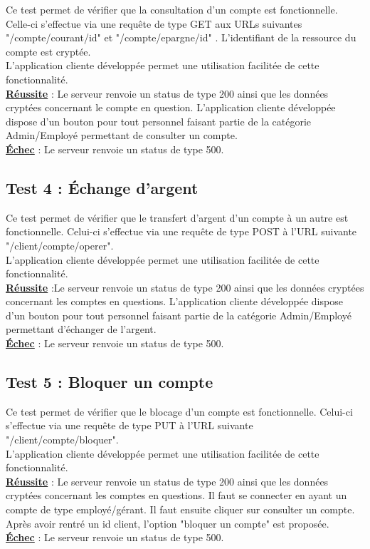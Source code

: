 Ce test permet de vérifier que la consultation d'un compte est fonctionnelle.
Celle-ci s'effectue via une requête de type GET aux URLs suivantes "/compte/courant/{id}" et "/compte/epargne/{id}" .
L'identifiant de la ressource du compte est cryptée.
\\
L'application cliente développée permet une utilisation facilitée de cette fonctionnalité. 
\\
\textbf{\underline{Réussite}} : Le serveur renvoie un status de type 200 ainsi que les données cryptées concernant le compte en question.
L'application cliente développée dispose d'un bouton pour tout personnel faisant partie de la catégorie Admin/Employé permettant de consulter un compte.
\\
\textbf{\underline{Échec}} : Le serveur renvoie un status de type 500.

\subsection{Test 4 : Échange d'argent}

Ce test permet de vérifier que le transfert d'argent d'un compte à un autre est fonctionnelle.
Celui-ci s'effectue via une requête de type POST à l’URL suivante "/client/compte/operer".
\\
L'application cliente développée permet une utilisation facilitée de cette fonctionnalité. 
\\
\textbf{\underline{Réussite}} :Le serveur renvoie un status de type 200 ainsi que les données cryptées concernant les comptes en questions.
L'application cliente développée dispose d'un bouton pour tout personnel faisant partie de la catégorie Admin/Employé permettant d'échanger de l'argent.
\\
\textbf{\underline{Échec}} : Le serveur renvoie un status de type 500.

\subsection{Test 5 : Bloquer un compte}

Ce test permet de vérifier que le blocage d'un compte est fonctionnelle.
Celui-ci s'effectue via une requête de type PUT à l’URL suivante "/client/compte/bloquer".
\\
L'application cliente développée permet une utilisation facilitée de cette fonctionnalité. 
\\
\textbf{\underline{Réussite}} : Le serveur renvoie un status de type 200 ainsi que les données cryptées concernant les comptes en questions.
Il faut se connecter en ayant un compte de type employé/gérant. Il faut ensuite cliquer sur consulter un compte. Après avoir rentré un id client, l'option "bloquer un compte" est proposée.
\\
\textbf{\underline{Échec}} :  Le serveur renvoie un status de type 500.

